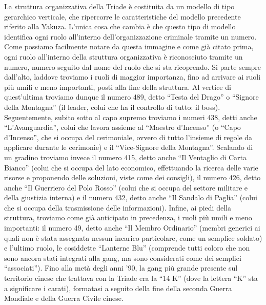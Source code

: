\documentclass[a4paper, 11pt]{article}
\begin{document}

La struttura organizzativa della Triade è costituita da un modello di tipo gerarchico verticale, che ripercorre le caratteristiche del modello precedente riferito alla Yakuza. L’unica cosa che cambia è che questo tipo di modello identifica ogni ruolo all’interno dell’organizzazione criminale tramite un numero. Come possiamo facilmente notare da questa immagine e come già citato prima, ogni ruolo all’interno della struttura organizzativa è riconosciuto tramite un numero, numero seguito dal nome del ruolo che si sta ricoprendo. Si parte sempre dall’alto, laddove troviamo i ruoli di maggior importanza, fino ad arrivare ai ruoli più umili e meno importanti, posti alla fine della struttura. Al vertice di quest’ultima troviamo dunque il numero 489, detto “Testa del Drago” o “Signore della Montagna” (il leader, colui che ha il controllo di tutto: il boss). Seguentemente, subito sotto al capo supremo troviamo i numeri 438, detti anche “L’Avanguardia”, colui che lavora assieme al “Maestro d’Incenso” (o “Capo d’Incenso”, che si occupa del cerimoniale, ovvero di tutto l’insieme di regole da applicare durante le cerimonie) e il “Vice-Signore della Montagna”. Scalando di un gradino troviamo invece il numero 415, detto anche “Il Ventaglio di Carta Bianco” (colui che si occupa del lato economico, effettuando la ricerca delle varie risorse e proponendo delle soluzioni, viste come dei consigli), il numero 426, detto anche “Il Guerriero del Polo Rosso” (colui che si occupa del settore militare e della giustizia interna) e il numero 432, detto anche “Il Sandalo di Paglia” (colui che si occupa della trasmissione delle informazioni). Infine, ai piedi della struttura, troviamo come già anticipato in precedenza, i ruoli più umili e meno importanti: il numero 49, detto anche “Il Membro Ordinario” (membri generici ai quali non è stata assegnata nessun incarico particolare, come un semplice soldato) e l’ultimo ruolo, le cosiddette “Lanterne Blu” (comprende tutti coloro che non sono ancora stati integrati alla gang, ma sono considerati come dei semplici “associati”). 
Fino alla metà degli anni ’90, la gang più grande presente sul territorio cinese che trattava con la Triade era la “14 K” (dove la lettera “K” sta a significare i carati), formatasi a seguito della fine della seconda Guerra Mondiale e della Guerra Civile cinese.
\end{document}

